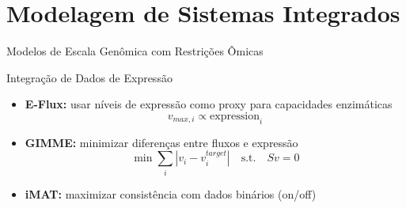 \section{Modelagem de Sistemas Integrados}

\begin{frame}{Modelos de Escala Genômica com Restrições Ômicas}

\begin{block}{Integração de Dados de Expressão}
\begin{itemize}
    \item \textbf{E-Flux:} usar níveis de expressão como proxy para capacidades enzimáticas
    \begin{equation*}
    v_{max,i} \propto \text{expression}_i
    \end{equation*}

    \item \textbf{GIMME:} minimizar diferenças entre fluxos e expressão
    \begin{equation*}
    \min \sum_i |v_i - v_i^{target}| \quad \text{s.t.} \quad Sv = 0
    \end{equation*}

    \item \textbf{iMAT:} maximizar consistência com dados binários (on/off)
\end{itemize}
\end{block}
\end{frame}


